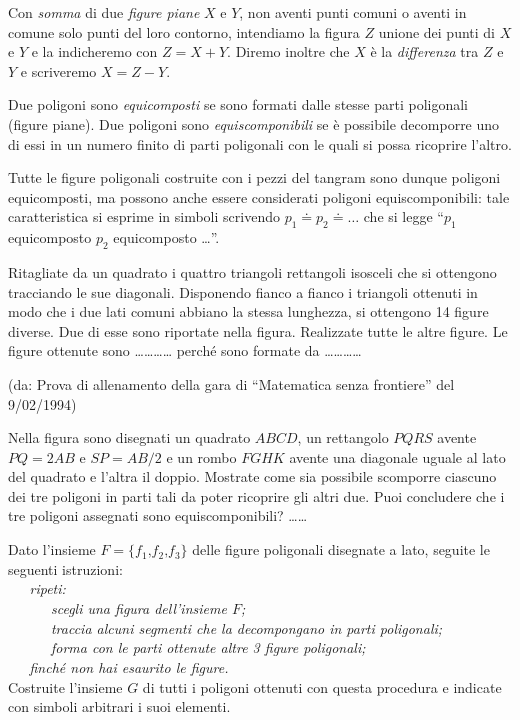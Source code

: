 \begin{definizione}
Con \emph{somma} di due \emph{figure piane} $X$ e $Y$, non aventi punti comuni o aventi in comune solo punti del loro contorno, intendiamo la figura $Z$ unione dei punti di $X$ e $Y$ e la indicheremo con $Z=X+Y$. Diremo inoltre che $X$ è la \emph{differenza} tra $Z$ e $Y$ e scriveremo $X=Z-Y$.
\end{definizione}

\begin{definizione}
Due poligoni sono \emph{equicomposti} se sono formati dalle stesse parti poligonali (figure piane).
Due poligoni sono \emph{equiscomponibili} se è possibile decomporre uno di essi in un numero finito di parti poligonali con le quali si possa ricoprire l'altro.
\end{definizione}

Tutte le figure poligonali costruite con i pezzi del tangram sono dunque poligoni equicomposti, ma possono anche essere considerati poligoni equiscomponibili: tale caratteristica si esprime in simboli scrivendo $p_1 \doteq p_2 \doteq \ldots{}$ che si legge ``$p_1$ equicomposto $p_2$ equicomposto \ldots{}''.

Ritagliate da un quadrato i quattro triangoli rettangoli isosceli che si ottengono tracciando le sue diagonali. Disponendo fianco a fianco i triangoli ottenuti in modo che i due lati comuni abbiano la stessa lunghezza, si ottengono 14 figure diverse. Due di esse sono riportate nella figura. Realizzate tutte le altre figure.
Le figure ottenute sono \ldots\ldots\ldots\ldots{} perché sono formate da \ldots\ldots\ldots\ldots{}

(da: Prova di allenamento della gara di ``Matematica senza frontiere'' del 9/02/1994)

Nella figura sono disegnati un quadrato $ABCD$, un rettangolo $PQRS$ avente $PQ=2AB$ e $SP=AB/2$ e un rombo $FGHK$ avente una diagonale uguale al lato del quadrato e l'altra il doppio. Mostrate come sia possibile scomporre ciascuno dei tre poligoni in parti tali da poter ricoprire gli altri due. Puoi concludere che i tre poligoni assegnati sono equiscomponibili? \ldots\ldots{}

Dato l'insieme $F = \{f_1\text{,}f_2\text{,}f_3\}$ delle figure poligonali disegnate a lato, seguite le seguenti istruzioni:\\
\verb|   |\textsl{ripeti:}\\
\verb|      |\textsl{scegli una figura dell'insieme $F$;}\\
\verb|      |\textsl{traccia alcuni segmenti che la decompongano in parti poligonali;}\\
\verb|      |\textsl{forma con le parti ottenute altre 3 figure poligonali;}\\
\verb|   |\textsl{finché non hai esaurito le figure.}\\
Costruite l'insieme $G$ di tutti i poligoni ottenuti con questa procedura e indicate con simboli arbitrari i suoi elementi.



